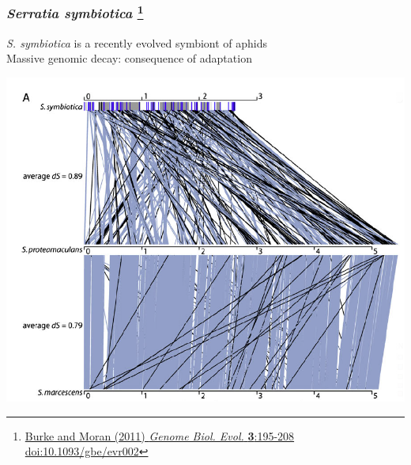 \begin{frame}
  \frametitle{\textit{Serratia symbiotica} 
  \footnote{\tiny{\href{http://dx.doi.org/10.1093/gbe/evr002}{Burke and Moran (2011) \textit{Genome Biol. Evol.} \textbf{3}:195-208 doi:10.1093/gbe/evr002}}}
  }
  \textit{S. symbiotica} is a recently evolved symbiont of aphids\\
  \textcolor{hutton_green}{Massive genomic decay: consequence of adaptation}\\
  \begin{center}
    \includegraphics[width=0.75\textheight]{images/s_symbiotica}
  \end{center}    
\end{frame}


